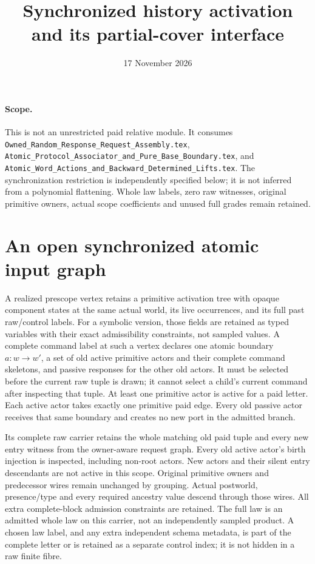 \documentclass[11pt]{article}
\title{Synchronized history activation and its partial-cover interface}
\date{17 November 2026}
\begin{document}
\maketitle
\paragraph{Scope.} This is not an unrestricted paid relative module. It consumes \texttt{Owned\_Random\_Response\_Request\_Assembly.tex}, \texttt{Atomic\_Protocol\_Associator\_and\_Pure\_Base\_Boundary.tex}, and \texttt{Atomic\_Word\_Actions\_and\_Backward\_Determined\_Lifts.tex}. The synchronization restriction is independently specified below; it is not inferred from a polynomial flattening. Whole law labels, zero raw witnesses, original primitive owners, actual scope coefficients and unused full grades remain retained.

\section{An open synchronized atomic input graph}
A realized prescope vertex retains a primitive activation tree with opaque component states at the same actual world, its live occurrences, and its full past raw/control labels. For a symbolic version, those fields are retained as typed variables with their exact admissibility constraints, not sampled values. A complete command label at such a vertex declares one atomic boundary $a:w\to w'$, a set of old active primitive actors and their complete command skeletons, and passive responses for the other old actors. It must be selected before the current raw tuple is drawn; it cannot select a child's current command after inspecting that tuple. At least one primitive actor is active for a paid letter. Each active actor takes exactly one primitive paid edge. Every old passive actor receives that same boundary and creates no new port in the admitted branch.

Its complete raw carrier retains the whole matching old paid tuple and every new entry witness from the owner-aware request graph. Every old active actor's birth injection is inspected, including non-root actors. New actors and their silent entry descendants are not active in this scope. Original primitive owners and predecessor wires remain unchanged by grouping. Actual postworld, presence/type and every required ancestry value descend through those wires. All extra complete-block admission constraints are retained. The full law is an admitted whole law on this carrier, not an independently sampled product. A chosen law label, and any extra independent schema metadata, is part of the complete letter or is retained as a separate control index; it is not hidden in a raw finite fibre.
\end{document}
